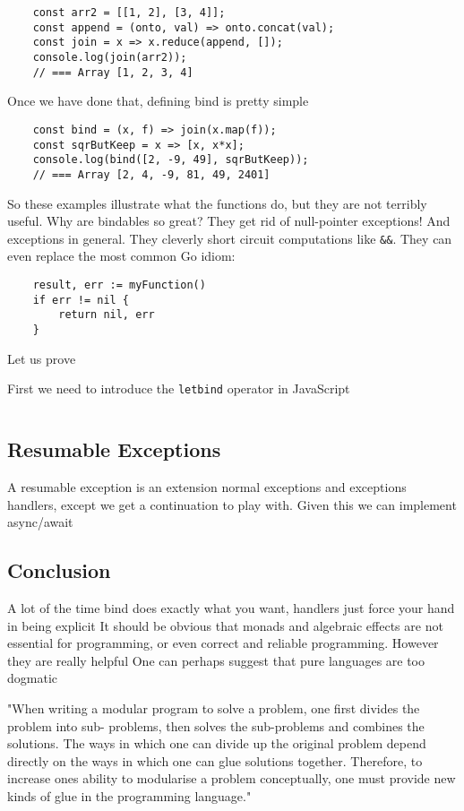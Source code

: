 \begin{verbatim}
    const arr2 = [[1, 2], [3, 4]];
    const append = (onto, val) => onto.concat(val);
    const join = x => x.reduce(append, []);
    console.log(join(arr2));
    // === Array [1, 2, 3, 4]
\end{verbatim}
Once we have done that, defining bind is pretty simple
\begin{verbatim}
    const bind = (x, f) => join(x.map(f));
    const sqrButKeep = x => [x, x*x];
    console.log(bind([2, -9, 49], sqrButKeep));
    // === Array [2, 4, -9, 81, 49, 2401]
\end{verbatim}

So these examples illustrate what the functions do,
but they are not terribly useful.
Why are bindables so great?
They get rid of null-pointer exceptions!
And exceptions in general.
They cleverly short circuit computations like \texttt{\&\&}.
They can even replace the most common Go idiom:
\begin{verbatim}
    result, err := myFunction()
    if err != nil {
        return nil, err
    }
\end{verbatim}

Let us prove

First we need to introduce the \texttt{letbind} operator in JavaScript

\begin{verbatim}
\end{verbatim}

\subsection{Resumable Exceptions}
A resumable exception is an extension normal exceptions
and exceptions handlers, except we get a continuation to play with.
Given this we can implement async/await

\subsection{Conclusion}

A lot of the time bind does exactly what you want,
handlers just force your hand in being explicit
It should be obvious that monads and algebraic effects
are not essential for programming,
or even correct and reliable programming.
However they are really helpful
One can perhaps suggest that pure languages are too dogmatic

"When writing a modular program to solve a problem, one first divides the problem into sub- problems, then solves the sub-problems and combines the solutions. The ways in which one can divide up the original problem depend directly on the ways in which one can glue solutions together. Therefore, to increase ones ability to modularise a problem conceptually, one must provide new kinds of glue in the programming language."
\cite{hughes1989functional}
